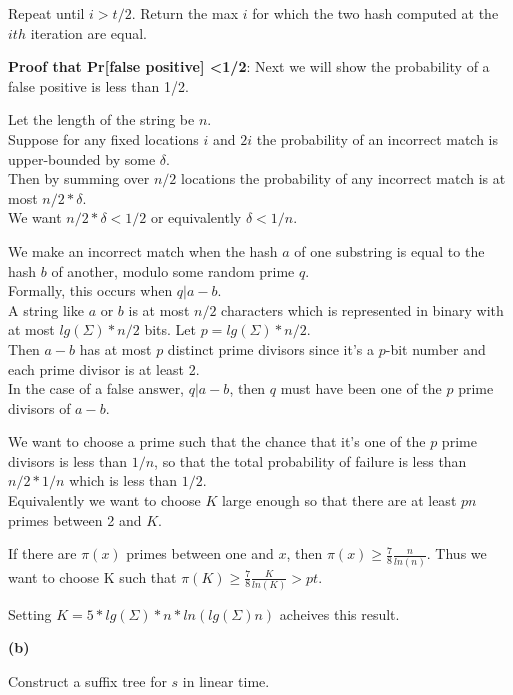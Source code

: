 \documentclass[11pt]{article}
\renewcommand{\part}[1] {\vspace{.10in} {\bf (#1)}}
\begin{document}
Repeat until $i > t/2$. Return the max $i$ for which the two hash computed at the $ith$ iteration are equal.

\textbf{Proof that Pr[false positive] \textless 1/2}:
Next we will show the probability of a false positive is less than 1/2.

Let the length of the string be $n$. \\
Suppose for any fixed locations $i$ and $2i$ the probability of an incorrect match is upper-bounded by some $\delta$.\\
Then by summing over $n/2$ locations the probability of any incorrect match is at most $n/2 * \delta$.\\
We want $n/2 * \delta < 1/2$ or equivalently $\delta < 1/n$.

We make an incorrect match when the hash $a$ of one substring is equal to the hash $b$ of another, modulo some random prime $q$.\\
Formally, this occurs when $q | a-b$.\\
A string like $a$ or $b$ is at most $n/2$ characters which is represented in binary with at most $lg(\Sigma)* n/2$ bits. Let $p=lg(\Sigma) * n/2$.\\

Then $a-b$ has at most $p$ distinct prime divisors since it's a $p$-bit number and each prime divisor is at least 2.\\
In the case of a false answer, $q | a-b$, then $q$ must have been one of the $p$ prime divisors of $a-b$.

We want to choose a prime such that the chance that it's one of the $p$ prime divisors is less than $1/n$, so that the total probability of failure is less than $n/2 * 1/n$ which is less than $1/2$.\\
Equivalently we want to choose $K$ large enough so that there are at least $pn$ primes between 2 and $K$.

If there are $\pi(x)$ primes between one and $x$, then $\pi(x) \geq \frac{7}{8} \frac{n}{ln(n)}$.
Thus we want to choose K such that
$\pi(K) \geq \frac{7}{8} \frac{K}{ln(K)} > pt$.

Setting $K = 5*lg(\Sigma)*n*ln(lg(\Sigma)n)$ acheives this result.


\part{b}

Construct a suffix tree for $s$ in linear time.
\end{document}
